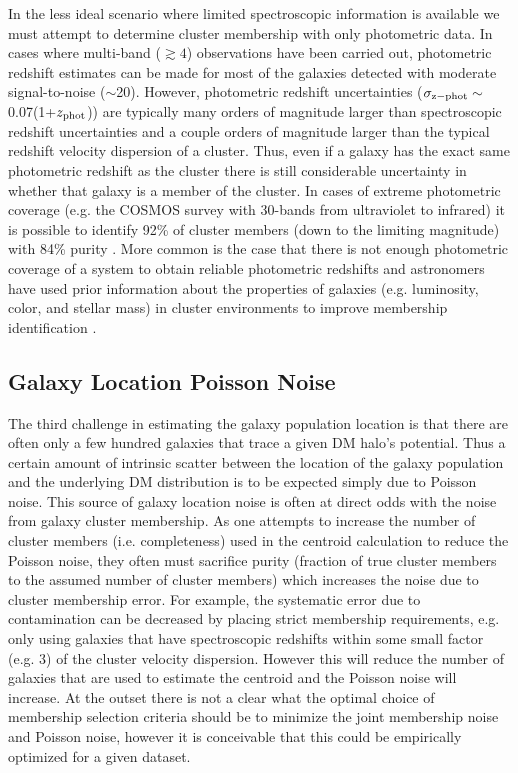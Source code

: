 In the less ideal scenario where limited spectroscopic information is available we must attempt to determine cluster membership with only photometric data.
In cases where multi-band ($\gtrsim 4$) observations have been carried out, photometric redshift estimates can be made for most of the galaxies detected with moderate signal-to-noise ($\sim$20).
However, photometric redshift uncertainties ($\sigma_{\rm z-phot}\sim$0.07(1+$z_{\rm phot}$)) are typically many orders of magnitude larger than spectroscopic redshift uncertainties and a couple orders of magnitude larger than the typical redshift velocity dispersion of a cluster.
Thus, even if a galaxy has the exact same photometric redshift as the cluster there is still considerable uncertainty in whether that galaxy is a member of the cluster.
In cases of extreme photometric coverage (e.g. the COSMOS survey with 30-bands from ultraviolet to infrared) it is possible to identify 92\% of cluster members (down to the limiting magnitude) with 84\% purity \citep{George:2011kv}.
More common is the case that there is not enough photometric coverage of a system to obtain reliable photometric redshifts and astronomers have used prior information about the properties of galaxies (e.g. luminosity, color, and stellar mass)  in cluster environments to improve membership identification \citep[see][for a review]{George:2012uo}. 

\subsection{Galaxy Location Poisson Noise}

The third challenge in estimating the galaxy population location is that there are often only a few hundred galaxies that trace a given DM halo's potential.
Thus a certain amount of intrinsic scatter between the location of the galaxy population and the underlying DM distribution is to be expected simply due to Poisson noise.
This source of galaxy location noise is often at direct odds with the noise from galaxy cluster membership.
As one attempts to increase the number of cluster members (i.e. completeness) used in the centroid calculation to reduce the Poisson noise, they often must sacrifice purity (fraction of true cluster members to the assumed number of cluster members) which increases the noise due to cluster membership error.
For example, the systematic error due to contamination can be decreased by placing strict membership requirements, e.g. only using galaxies that have spectroscopic redshifts within some small factor (e.g. 3) of the cluster velocity dispersion.
However this will reduce the number of galaxies that are used to estimate the centroid and the Poisson noise will increase.
At the outset there is not a clear what the optimal choice of membership selection criteria should be to minimize the joint membership noise and Poisson noise, however it is conceivable that this could be empirically optimized for a given dataset.

